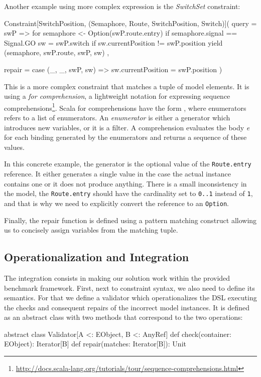 Another example using more complex expression is the \emph{SwitchSet} constraint:
%
\begin{scalacode}
Constraint[SwitchPosition, (Semaphore, Route, SwitchPosition, Switch)](
  query = swP => {
    for {
      semaphore <- Option(swP.route.entry) if semaphore.signal == Signal.GO
      sw = swP.switch if sw.currentPosition != swP.position
    } yield (semaphore, swP.route, swP, sw)
  },

  repair = {
    case (_, _, swP, sw) => sw.currentPosition = swP.position
  }
)
\end{scalacode}
%
This is a more complex constraint that matches a tuple of model elements.
It is using a \emph{for comprehension}, a lightweight notation for expressing sequence comprehensions\footnote{\url{http://docs.scala-lang.org/tutorials/tour/sequence-comprehensions.html}}.
Scala for comprehensions have the form , where enumerators refers to a list of enumerators.
An \emph{enumerator} is either a generator which introduces new variables, or it is a filter.
A comprehension evaluates the body \emph{e} for each binding generated by the enumerators and returns a sequence of these values.

In this concrete example, the generator is the optional value of the \texttt{Route.entry} reference.
It either generates a single value in the case the actual instance contains one or it does not produce anything.
There is a small inconsistency in the model, the \texttt{Route.entry} should have the cardinality set to \texttt{0..1} instead of \texttt{1}, and that is why we need to explicitly convert the reference to an \texttt{Option}.

Finally, the repair function is defined using a pattern matching construct allowing us to concisely assign variables from the matching tuple.

\subsection{Operationalization and Integration}

The integration consists in making our solution work within the provided benchmark framework.
First, next to constraint syntax, we also need to define its semantics.
For that we define a validator which operationalizes the DSL executing the checks and consequent repairs of the incorrect model instances.
It is defined as an abstract class with two methods that correspond to the two operations:
%
\begin{scalacode}
abstract class Validator[A <: EObject, B <: AnyRef] {
  def check(container: EObject): Iterator[B]
  def repair(matches: Iterator[B]): Unit
}
\end{scalacode}
%

